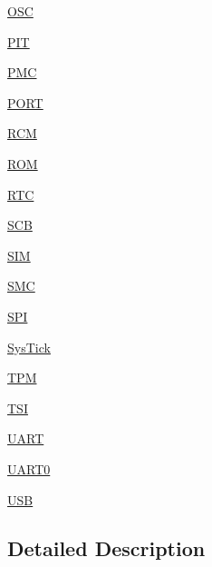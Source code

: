 \begin{DoxyCompactItemize}
\hyperlink{group___o_s_c___peripheral}{O\+SC}
\item 
\hyperlink{group___p_i_t___peripheral}{P\+IT}
\item 
\hyperlink{group___p_m_c___peripheral}{P\+MC}
\item 
\hyperlink{group___p_o_r_t___peripheral}{P\+O\+RT}
\item 
\hyperlink{group___r_c_m___peripheral}{R\+CM}
\item 
\hyperlink{group___r_o_m___peripheral}{R\+OM}
\item 
\hyperlink{group___r_t_c___peripheral}{R\+TC}
\item 
\hyperlink{group___s_c_b___peripheral}{S\+CB}
\item 
\hyperlink{group___s_i_m___peripheral}{S\+IM}
\item 
\hyperlink{group___s_m_c___peripheral}{S\+MC}
\item 
\hyperlink{group___s_p_i___peripheral}{S\+PI}
\item 
\hyperlink{group___sys_tick___peripheral}{Sys\+Tick}
\item 
\hyperlink{group___t_p_m___peripheral}{T\+PM}
\item 
\hyperlink{group___t_s_i___peripheral}{T\+SI}
\item 
\hyperlink{group___u_a_r_t___peripheral}{U\+A\+RT}
\item 
\hyperlink{group___u_a_r_t0___peripheral}{U\+A\+R\+T0}
\item 
\hyperlink{group___u_s_b___peripheral}{U\+SB}
\end{DoxyCompactItemize}


\subsection{Detailed Description}
